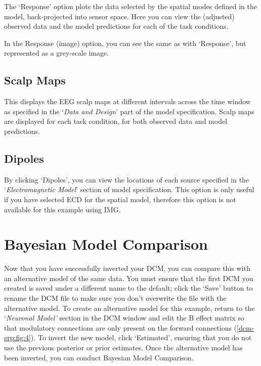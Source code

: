 The `Response' option plots the data selected by the spatial modes
defined in the model, back-projected into sensor space. Here you can
view the (adjusted) observed data and the model predictions for each of
the task conditions.

In the Response (image) option, you can see the same as with `Response',
but represented as a grey-scale image.

\subsection{Scalp Maps}

This displays the EEG scalp maps at different intervals across the time
window as specified in the `\emph{Data and Design}' part of the model
specification. Scalp maps are displayed for each task condition, for
both observed data and model predictions.

\subsection{Dipoles}

By clicking `Dipoles', you can view the locations of each source
specified in the `\emph{Electromagnetic Model}' section of model
specification. This option is only useful if you have selected ECD for
the spatial model, therefore this option is not available for this
example using IMG.

\section{Bayesian Model Comparison}

Now that you have successfully inverted your DCM, you can compare this
with an alternative model of the same data. You must ensure that the
first DCM you created is saved under a different name to the default;
click the `Save' button to rename the DCM file to make sure you don't
overwrite the file with the alternative model. To create an alternative
model for this example, return to the `\emph{Neuronal Model'} section in
the DCM window and edit the B effect matrix so that modulatory
connections are only present on the forward connections (\ref{dcm-erp:fig:4}).
To invert the new model, click `Estimated', ensuring that you do
not use the previous posterior or prior estimates. Once the alternative
model has been inverted, you can conduct Bayesian Model Comparison.

